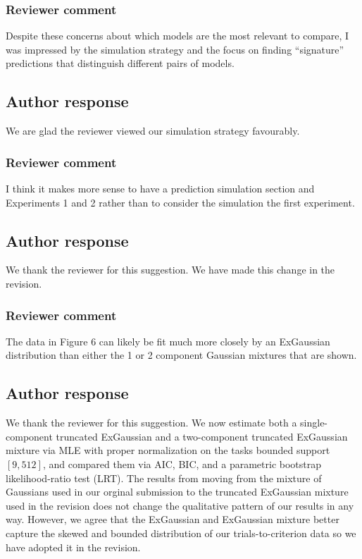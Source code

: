 \documentclass[12pt]{article}
\begin{document}
\subsubsection{Reviewer comment}
Despite these concerns about which models are the most
relevant to compare, I was impressed by the simulation
strategy and the focus on finding ``signature'' predictions
that distinguish different pairs of models.

\subsection{Author response}
We are glad the reviewer viewed our simulation strategy
favourably.

\subsubsection{Reviewer comment}
I think it makes more sense to have a prediction simulation
section and Experiments 1 and 2 rather than to consider the
simulation the first experiment.

\subsection{Author response}
We thank the reviewer for this suggestion. We have made this
change in the revision.

\subsubsection{Reviewer comment}
The data in Figure 6 can likely be fit much more closely by
an ExGaussian distribution than either the 1 or 2 component
Gaussian mixtures that are shown.

\subsection{Author response}
We thank the reviewer for this suggestion. We now estimate
both a single-component truncated ExGaussian and a
two-component truncated ExGaussian mixture via MLE with
proper normalization on the tasks bounded support $[9,
512]$, and compared them via AIC, BIC, and a parametric
bootstrap likelihood-ratio test (LRT).  The results from
moving from the  mixture of Gaussians used in our orginal
submission to the truncated ExGaussian mixture used in the
revision does not change the qualitative pattern of our
results in any way. However, we agree that the ExGaussian
and ExGaussian mixture better capture the skewed and bounded
distribution of our trials-to-criterion data so we have
adopted it in the revision. 
\end{document}
